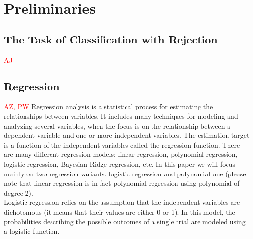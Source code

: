 \documentclass{llncs}
\begin{document}
\section{Preliminaries}
  \label{sec:preliminaries}

\subsection{The Task of Classification with Rejection}
\textcolor{red} {AJ}


\subsection{Regression}
\textcolor{red} {AZ, PW}
Regression analysis is a statistical process for estimating the relationships between variables. It includes many techniques for modeling and analyzing several variables, when the focus is on the relationship between a dependent variable and one or more independent variables. The estimation target is a function of the independent variables called the regression function. There are many different regression models: linear regression, polynomial regression, logistic regression, Bayesian Ridge regression, etc. In this paper we will focus mainly on two regression variants: logistic regression and polynomial one (please note that linear regression is in fact polynomial regression using polynomial of degree 2). \\

Logistic regression relies on the assumption that the independent variables are dichotomous (it means that their values are either 0 or 1). In this model, the probabilities describing the possible outcomes of a single trial are modeled using a logistic function. %


\end{document}
